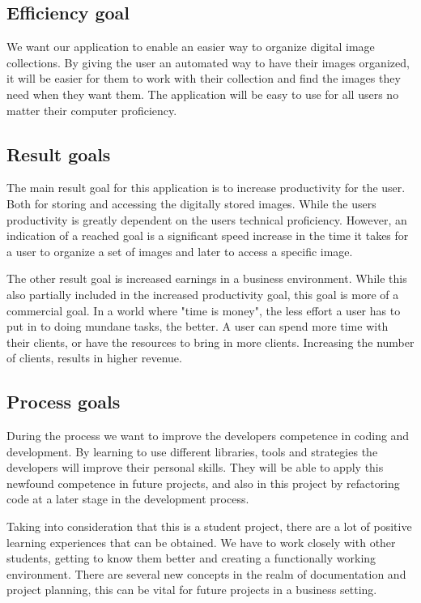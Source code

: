 \documentclass{article}
\begin{document}
\subsection{Efficiency goal}
We want our application to enable an easier way to organize digital image collections. By giving the user an automated way to have their images organized, it will be easier for them to work with their collection and find the images they need when they want them. The application will be easy to use for all users no matter their computer proficiency.

\subsection{Result goals}
The main result goal for this application is to increase productivity for the user. Both for storing and accessing the digitally stored images. While the users productivity is greatly dependent on the users technical proficiency. However, an indication of a reached goal is a significant speed increase in the time it takes for a user to organize a set of images and later to access a specific image.

The other result goal is increased earnings in a business environment. While this also partially included in the increased productivity goal, this goal is more of a commercial goal. In a world where "time is money", the less effort a user has to put in to doing mundane tasks, the better. A user can spend more time with their clients, or have the resources to bring in more clients. Increasing the number of clients, results in higher revenue.

\subsection{Process goals}
During the process we want to improve the developers competence in coding and development. By learning to use different libraries, tools and strategies the developers will improve their personal skills. They will be able to apply this newfound competence in future projects, and also in this project by refactoring code at a later stage in the development process. 

Taking into consideration that this is a student project, there are a lot of positive learning experiences that can be obtained. We have to work closely with other students, getting to know them better and creating a functionally working environment. There are several new concepts in the realm of documentation and project planning, this can be vital for future projects in a business setting.
\end{document}
